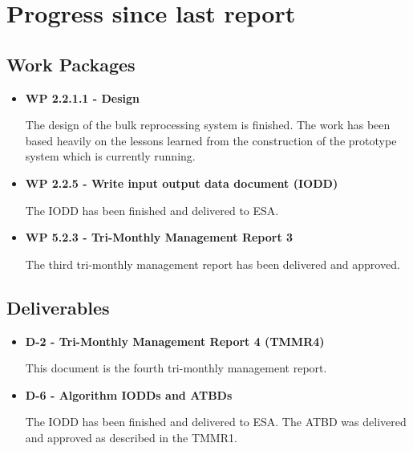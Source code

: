 \chapter{Progress since last report}
\label{chapter:progress}


\section{Work Packages}

\begin{itemize}

\item{\bf WP 2.2.1.1 - Design}

The design of the bulk reprocessing system is finished. The work has been based heavily on the lessons learned from the construction of the prototype system which is currently running. 


\item{\bf WP 2.2.5 - Write input output data document (IODD)}

The IODD has been finished and delivered to ESA. 


\item{\bf WP 5.2.3 - Tri-Monthly Management Report 3}

The third tri-monthly management report has been delivered and approved.

\end{itemize}



\section{Deliverables}

\begin{itemize}

\item{\bf D-2 - Tri-Monthly Management Report 4 (TMMR4)}

This document is the fourth tri-monthly management report.

\item{\bf D-6 - Algorithm IODDs and ATBDs}

The IODD has been finished and delivered to ESA. The ATBD was delivered and approved as described in the TMMR1.

\end{itemize}

